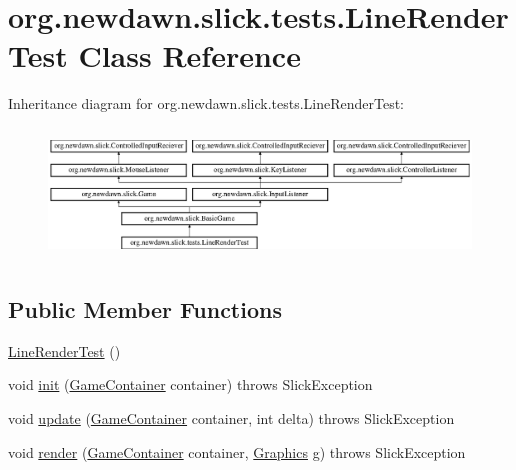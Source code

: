 \hypertarget{classorg_1_1newdawn_1_1slick_1_1tests_1_1_line_render_test}{}\section{org.\+newdawn.\+slick.\+tests.\+Line\+Render\+Test Class Reference}
\label{classorg_1_1newdawn_1_1slick_1_1tests_1_1_line_render_test}
Inheritance diagram for org.\+newdawn.\+slick.\+tests.\+Line\+Render\+Test\+:\begin{figure}[H]
\begin{center}
\leavevmode
\includegraphics[height=3.522012cm]{classorg_1_1newdawn_1_1slick_1_1tests_1_1_line_render_test}
\end{center}
\end{figure}
\subsection*{Public Member Functions}
\begin{DoxyCompactItemize}
\item 
\mbox{\hyperlink{classorg_1_1newdawn_1_1slick_1_1tests_1_1_line_render_test_a65089738ee2b44a06070e64f630cc2d3}{Line\+Render\+Test}} ()
\item 
void \mbox{\hyperlink{classorg_1_1newdawn_1_1slick_1_1tests_1_1_line_render_test_ad81e104460d7056367ed19a5150214b2}{init}} (\mbox{\hyperlink{classorg_1_1newdawn_1_1slick_1_1_game_container}{Game\+Container}} container)  throws Slick\+Exception 
\item 
void \mbox{\hyperlink{classorg_1_1newdawn_1_1slick_1_1tests_1_1_line_render_test_afcec9cc5b92bd4c527f7efb52ddd9697}{update}} (\mbox{\hyperlink{classorg_1_1newdawn_1_1slick_1_1_game_container}{Game\+Container}} container, int delta)  throws Slick\+Exception 
\item 
void \mbox{\hyperlink{classorg_1_1newdawn_1_1slick_1_1tests_1_1_line_render_test_a6193c85f0e7e66eff8bf5994f7564abe}{render}} (\mbox{\hyperlink{classorg_1_1newdawn_1_1slick_1_1_game_container}{Game\+Container}} container, \mbox{\hyperlink{classorg_1_1newdawn_1_1slick_1_1_graphics}{Graphics}} g)  throws Slick\+Exception 
\end{DoxyCompactItemize}
